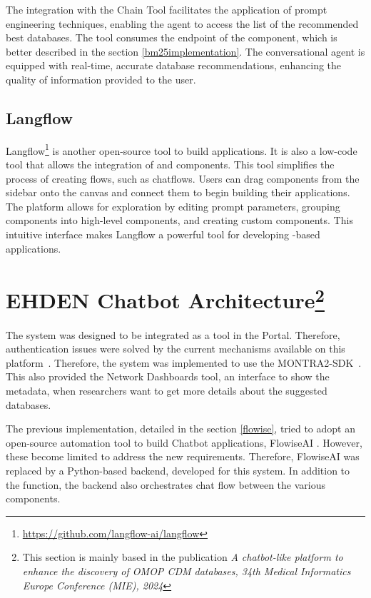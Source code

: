 The integration with the Chain Tool facilitates the application of prompt engineering techniques, enabling the agent to access the list of the recommended best databases. The tool consumes the endpoint of the {\ir} component, which is better described in the section \ref{bm25implementation}. The conversational agent is equipped with real-time, accurate database recommendations, enhancing the quality of information provided to the user. 


\subsection{Langflow}

Langflow\footnote{\url{https://github.com/langflow-ai/langflow}} is another open-source tool to build {\ai} applications. It is also a low-code tool that allows the integration of {\llm} and {\ai} components. This tool simplifies the process of creating flows, such as chatflows. Users can drag components from the sidebar onto the canvas and connect them to begin building their applications. The platform allows for exploration by editing prompt parameters, grouping components into high-level components, and creating custom components. This intuitive interface makes Langflow a powerful tool for developing {\llm}-based applications.


 


\section{EHDEN Chatbot Architecture\protect\footnote{This section is mainly based in the publication \textit{A chatbot-like platform to enhance the
discovery of OMOP CDM databases, 34th Medical Informatics Europe Conference (MIE), 2024}}}


The system was designed to be integrated as a tool in the {\ehden} Portal. Therefore, authentication issues were solved by the current mechanisms available on this platform~\cite{almeida2024federated}. Therefore, the system was implemented to use the MONTRA2-SDK~\cite{almeida2024montra2}. This also provided the Network Dashboards tool, an interface to show the metadata, when researchers want to get more details about the suggested databases. 

The previous implementation, detailed in the section \ref{flowise}, tried to adopt an open-source automation tool to build Chatbot applications, FlowiseAI \cite{reis2024flowise}. However, these become limited to address the new requirements. Therefore, FlowiseAI was replaced by a Python-based backend, developed for this system. In addition to the {\ir} function, the backend also orchestrates chat flow between the various components.

